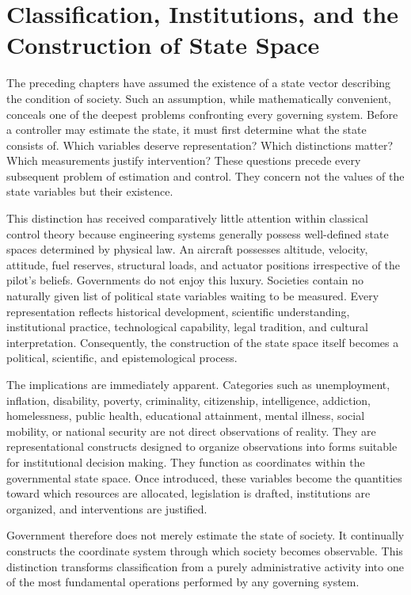 \documentclass[12pt,a4paper]{article}
\begin{document}
\section{Classification, Institutions, and the Construction of State Space}

The preceding chapters have assumed the existence of a state vector describing the condition of society. Such an assumption, while mathematically convenient, conceals one of the deepest problems confronting every governing system. Before a controller may estimate the state, it must first determine what the state consists of. Which variables deserve representation? Which distinctions matter? Which measurements justify intervention? These questions precede every subsequent problem of estimation and control. They concern not the values of the state variables but their existence.

This distinction has received comparatively little attention within classical control theory because engineering systems generally possess well-defined state spaces determined by physical law. An aircraft possesses altitude, velocity, attitude, fuel reserves, structural loads, and actuator positions irrespective of the pilot's beliefs. Governments do not enjoy this luxury. Societies contain no naturally given list of political state variables waiting to be measured. Every representation reflects historical development, scientific understanding, institutional practice, technological capability, legal tradition, and cultural interpretation. Consequently, the construction of the state space itself becomes a political, scientific, and epistemological process.

The implications are immediately apparent. Categories such as unemployment, inflation, disability, poverty, criminality, citizenship, intelligence, addiction, homelessness, public health, educational attainment, mental illness, social mobility, or national security are not direct observations of reality. They are representational constructs designed to organize observations into forms suitable for institutional decision making. They function as coordinates within the governmental state space. Once introduced, these variables become the quantities toward which resources are allocated, legislation is drafted, institutions are organized, and interventions are justified.

Government therefore does not merely estimate the state of society. It continually constructs the coordinate system through which society becomes observable. This distinction transforms classification from a purely administrative activity into one of the most fundamental operations performed by any governing system.
\end{document}
